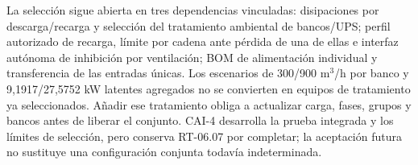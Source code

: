 La selección sigue abierta en tres dependencias vinculadas: disipaciones por descarga/recarga y selección del tratamiento ambiental de bancos/UPS; perfil autorizado de recarga, límite por cadena ante pérdida de una de ellas e interfaz autónoma de inhibición por ventilación; BOM de alimentación individual y transferencia de las entradas únicas. Los escenarios de 300/900 m$^3$/h por banco y 9,1917/27,5752 kW latentes agregados no se convierten en equipos de tratamiento ya seleccionados. Añadir ese tratamiento obliga a actualizar carga, fases, grupos y bancos antes de liberar el conjunto. CAI-4 desarrolla la prueba integrada y los límites de selección, pero conserva RT-06.07 por completar; la aceptación futura no sustituye una configuración conjunta todavía indeterminada.
